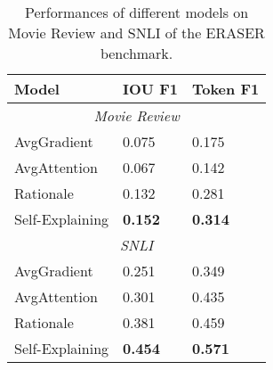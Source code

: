 \documentclass[11pt,a4paper]{article}
\begin{document}
\begin{comment}
\subsection{Evaluation on ERASER}
We also evaluate interpretability performances of different models on the ERASER dataset \citep{deyoung-etal-2020-eraser}. 
Evaluations are conducted on the 
Movie Review dataset and SNLI dataset in ERASER.  
Since the dataset is labeled in a way that an input can contain multiple rationales, we treat the threshold for  as the hyper-parameter to be tuned on the dev sets of ERASER.
Spans with  higher than the threshold will be selected. To deal with the issue of overlapping spans, we adopt the following strategy: we select spans in a top-down fashion, and the current span will be ignored if it overlaps with previously selected spans. 
We compared the extracted spans with the golden labeled spans and report  IOU F1 and token F1 scores. 
Results are shown in Table \ref{tab:eraser}. Performances on both the Movie Review and the SNLI datasets exhibit significant improvements of Self-Explaining over other baselines, demonstrating the stronger ability of extracting rationales of the proposed Self-Explaining method.
\end{comment}

\begin{table}[t]
  \centering
  \small
  \begin{tabular}{lll}
    \toprule
    {\bf Model} & {\bf IOU F1} & {\bf Token F1}\\
    \hline\hline 
    \multicolumn{3}{c}{\textit{Movie Review}}\\
    \midrule
    AvgGradient & 0.075 & 0.175 \\ 
    AvgAttention & 0.067 & 0.142  \\
    Rationale \citep{lei2016rationalizing} & 0.132  & 0.281 \\
    Self-Explaining & {\bf 0.152} & {\bf 0.314}  \\
    \hline\hline 
    \multicolumn{3}{c}{\textit{SNLI}}\\
    \midrule
    AvgGradient & 0.251& 0.349  \\ 
    AvgAttention & 0.301 &  0.435 \\
    Rationale \citep{lei2016rationalizing} & 0.381 & 0.459 \\
    Self-Explaining & {\bf 0.454} & {\bf 0.571}  \\
    \bottomrule
  \end{tabular}
  \caption{Performances of different models on Movie Review and SNLI of the ERASER benchmark.}
  \label{tab:eraser}
\end{table}
\end{document}
